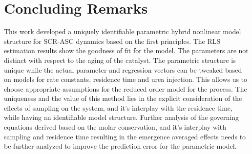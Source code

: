 \newpage
\section{Concluding Remarks}
This work developed a uniquely identifiable parametric hybrid nonlinear model structure for SCR-ASC dynamics based on
the first principles. The RLS estimation results show the goodness of fit for the model. The parameters are not distinct
with respect to the aging of the catalyst. The parametric structure is unique while the actual parameter and regression
vectors can be tweaked based on models for rate constants, residence time and urea injection. This allows us to choose
appropriate assumptions for the reduced order model for the process. The uniqueness and the value of this method lies in
the explicit consideration of the effects of sampling on the system, and it's interplay with the residence time, while
having an identifiable model structure. Further analysis of the governing equations derived based on the molar
conservation, and it's interplay with sampling and residence time resulting in the emergence averaged effects needs to
be further analyzed to improve the prediction error for the parametric model.

